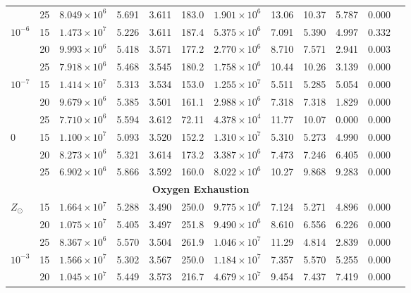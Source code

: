 {\begin{table}[h!]
{\begin{tabular}{lccccccccccc}
                    & 25 & $8.049 \times 10^6$  & 5.691 & 3.611 & 183.0 & $1.901 \times 10^6$ & 13.06  & 10.37  & 5.787  & 0.000  \\
        $10^{-6}$   & 15 & $1.473 \times 10^7$  & 5.226 & 3.611 & 187.4 & $5.375 \times 10^6$ & 7.091  & 5.390  & 4.997  & 0.332 \\
                    & 20 & $9.993 \times 10^6$  & 5.418 & 3.571 & 177.2 & $2.770 \times 10^6$ & 8.710  & 7.571  & 2.941  & 0.003  \\
                    & 25 & $7.918 \times 10^6$  & 5.468 & 3.545 & 180.2 & $1.758 \times 10^6$ & 10.44  & 10.26  & 3.139  & 0.000  \\
        $10^{-7}$   & 15 & $1.414 \times 10^7$  & 5.313 & 3.534 & 153.0 & $1.255 \times 10^7$ & 5.511  & 5.285  & 5.054  & 0.000  \\
                    & 20 & $9.679 \times 10^6$  & 5.385 & 3.501 & 161.1 & $2.988 \times 10^6$ & 7.318  & 7.318  & 1.829  & 0.000  \\
                    & 25 & $7.710 \times 10^6$  & 5.594 & 3.612 & 72.11 & $4.378 \times 10^4$ & 11.77  & 10.07  & 0.000  & 0.000  \\
        $0$         & 15 & $1.100 \times 10^7$  & 5.093 & 3.520 & 152.2 & $1.310 \times 10^7$ & 5.310  & 5.273  & 4.990  & 0.000  \\
                    & 20 & $8.273 \times 10^6$  & 5.321 & 3.614 & 173.2 & $3.387 \times 10^6$ & 7.473  & 7.246  & 6.405  & 0.000  \\
                    & 25 & $6.902 \times 10^6$  & 5.866 & 3.592 & 160.0 & $8.022 \times 10^6$ & 10.27  & 9.868  & 9.283  & 0.000  \\
        \midrule
        \multicolumn{11}{c}{\textbf{ Oxygen Exhaustion }} \\
        \midrule
        $Z_{\odot}$ & 15 & $1.664 \times 10^7$  & 5.288 & 3.490 & 250.0 & $9.775 \times 10^6$ & 7.124  & 5.271  & 4.896  & 0.000  \\
                    & 20 & $1.075 \times 10^7$  & 5.405 & 3.497 & 251.8 & $9.490 \times 10^6$ & 8.610  & 6.556  & 6.226  & 0.000  \\
                    & 25 & $8.367 \times 10^6$  & 5.570 & 3.504 & 261.9 & $1.046 \times 10^7$ & 11.29  & 4.814  & 2.839  & 0.000  \\
        $10^{-3}$   & 15 & $1.566 \times 10^7$  & 5.302 & 3.567 & 250.0 & $1.184 \times 10^7$ & 7.357  & 5.570  & 5.255  & 0.000  \\
                    & 20 & $1.045 \times 10^7$  & 5.449 & 3.573 & 216.7 & $4.679 \times 10^7$ & 9.454  & 7.437  & 7.419  & 0.000  \\

\end{tabular}}
\end{table}}
